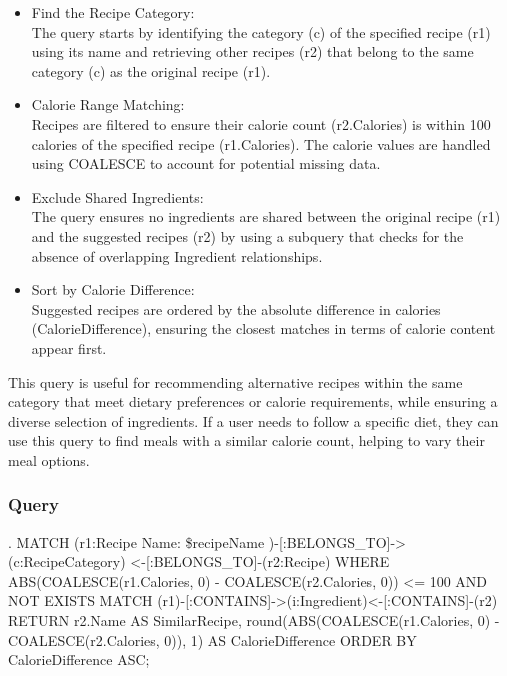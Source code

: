 \begin{enumerate}
\begin{itemize}
        \item Find the Recipe Category:\\
        The query starts by identifying the category (c) of the specified recipe (r1) using its name and retrieving other recipes (r2) that belong to the same category (c) as the original recipe (r1).
        \item Calorie Range Matching:\\
        Recipes are filtered to ensure their calorie count (r2.Calories) is within 100 calories of the specified recipe (r1.Calories).
        The calorie values are handled using COALESCE to account for potential missing data.
        \item Exclude Shared Ingredients:\\
        The query ensures no ingredients are shared between the original recipe (r1) and the suggested recipes (r2) by using a subquery that checks for the absence of overlapping Ingredient relationships.
        \item Sort by Calorie Difference:\\
        Suggested recipes are ordered by the absolute difference in calories (CalorieDifference), ensuring the closest matches in terms of calorie content appear first.
    \end{itemize}
This query is useful for recommending alternative recipes within the same category that meet dietary preferences or calorie requirements, while ensuring a diverse selection of ingredients. If a user needs to follow a specific diet, they can use this query to find meals with a similar calorie count, helping to vary their meal options. 
            \subsubsection{Query}
\begin{CypherQuery}
.
MATCH (r1:Recipe {Name: \$recipeName })-[:BELONGS_TO]->(c:RecipeCategory)
<-[:BELONGS_TO]-(r2:Recipe)
WHERE ABS(COALESCE(r1.Calories, 0) - COALESCE(r2.Calories, 0)) <= 100  AND NOT EXISTS {
MATCH (r1)-[:CONTAINS]->(i:Ingredient)<-[:CONTAINS]-(r2) 
}
RETURN r2.Name AS SimilarRecipe,
round(ABS(COALESCE(r1.Calories, 0) - COALESCE(r2.Calories, 0)), 1) 
AS CalorieDifference
ORDER BY CalorieDifference ASC; 
\end{CypherQuery}

\end{enumerate}

